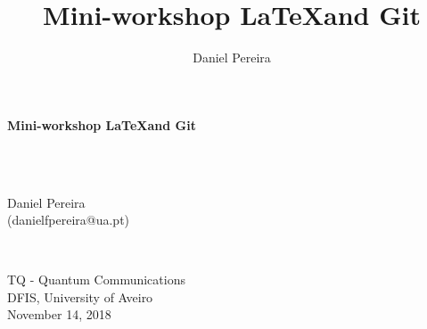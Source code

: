 \documentclass[usenames,dvipsnames,aspectratio=169]{beamer}
\title{Mini-workshop \LaTeX and Git}
\author{Daniel Pereira}
\institute{Departamento de Física - Universidade de Aveiro}
\begin{document}
{
%
\begin{frame}
\color{black} \sffamily \noindent \large
\hspace*{1cm}
\begin{minipage}{10cm}
\vspace*{.4cm}
\begin{flushleft}
 \color{title} \sffamily \noindent \Large
\textbf{Mini-workshop \LaTeX and Git}
\end{flushleft}
\end{minipage}
\vspace*{.8cm}\\
%
~\\
\hspace*{1cm}
\begin{minipage}{3cm}
\color{author}
\large Daniel Pereira\\
(danielfpereira@ua.pt)
\end{minipage}
% 
\vspace*{.8cm}\\
\hspace*{1cm}
\begin{minipage}{6cm}
\color{title}
\large TQ - Quantum Communications\\
DFIS, University of Aveiro\\
November 14, 2018 
\end{minipage}
\end{frame}
}


\end{document}
